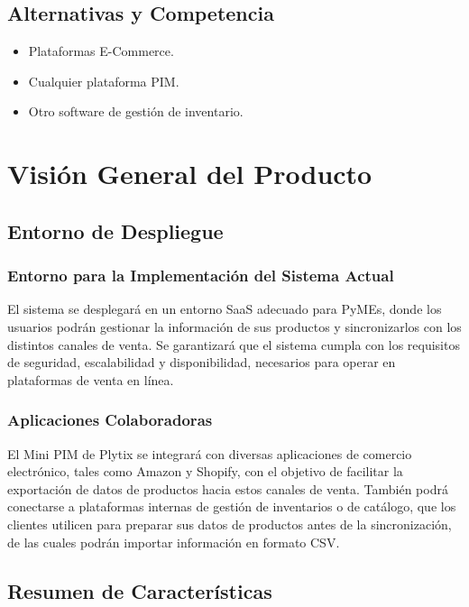 \documentclass[12pt.a4paper]{article}
\begin{document}
\subsection{Alternativas y Competencia}

\begin{itemize}
    \item Plataformas E-Commerce.
    \item Cualquier plataforma PIM.
    \item Otro software de gestión de inventario.
\end{itemize}


\section{Visión General del Producto}

\subsection{Entorno de Despliegue}

\subsubsection{Entorno para la Implementación del Sistema Actual}
El sistema se desplegará en un entorno SaaS adecuado para PyMEs, donde los usuarios podrán gestionar la información de sus productos y sincronizarlos con los distintos canales de venta. Se garantizará que el sistema cumpla con los requisitos de seguridad, escalabilidad y disponibilidad, necesarios para operar en plataformas de venta en línea.

\subsubsection{Aplicaciones Colaboradoras}
El Mini PIM de Plytix se integrará con diversas aplicaciones de comercio electrónico, tales como Amazon y Shopify, con el objetivo de facilitar la exportación de datos de productos hacia estos canales de venta. También podrá conectarse a plataformas internas de gestión de inventarios o de catálogo, que los clientes utilicen para preparar sus datos de productos antes de la sincronización, de las cuales podrán importar información en formato CSV.

\subsection{Resumen de Características}
\end{document}
